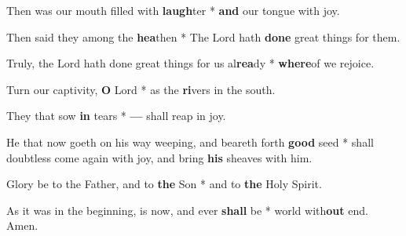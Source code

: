 \begin{multicols}{2}
	Then was our mouth filled with \textbf{laugh}ter * \textbf{and} our tongue with joy.
	
	Then said they among the \textbf{hea}then * The Lord hath \textbf{done} great things for them.
	
	Truly, the Lord hath done great things for us al\textbf{rea}dy * \textbf{where}of we rejoice.
	
	Turn our captivity, \textbf{O} Lord * as the \textbf{ri}vers in the south.
	
	They that sow \textbf{in} tears * \textbf{---} shall reap in joy.
	
	He that now goeth on his way weeping, and beareth forth \textbf{good} seed * shall doubtless come again with joy, and bring \textbf{his} sheaves with him.
	
	Glory be to the Father, and to \textbf{the} Son * and to \textbf{the} Holy Spirit.
	
	As it was in the beginning, is now, and ever \textbf{shall} be * world with\textbf{out} end. Amen.
\end{multicols}